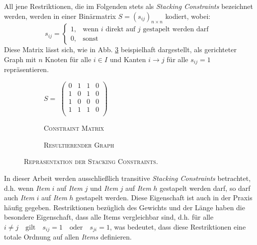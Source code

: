 All jene Restriktionen, die im Folgenden stets als \textit{Stacking Constraints} bezeichnet werden, werden in einer Binärmatrix $S = (s_{ij})_{n \times n}$ kodiert, wobei:
\[
    s_{ij} =
\begin{cases}
    1, & \text{wenn $i$ direkt auf $j$ gestapelt werden darf }\\
    0, & \text{sonst}
\end{cases}
\]
Diese Matrix lässt sich, wie in Abb. \ref{fig:matrix_to_graph} beispielhaft dargestellt,
als gerichteter Graph mit $n$ Knoten für alle $i \in I$ und Kanten $i \rightarrow j$ für alle $s_{ij} = 1$ repräsentieren.
\begin{figure}[H]
  \begin{subfigure}[b]{0.5\textwidth}
  \centering
    $S =$
    $\left(
    \begin{array}{rrrr}
    0 & 1 & 1 & 0 \\
    1 & 0 & 1 & 0 \\
    1 & 0 & 0 & 0 \\
    1 & 1 & 1 & 0 \\
    \end{array} \right) $
    \caption{\textsc{Constraint Matrix}}
    \label{fig:constraint_matrix}
  \end{subfigure}
  \hfill
  \begin{subfigure}[b]{0.5\textwidth}
  \centering
    \caption{\textsc{Resultierender Graph}}
    \label{fig:resulting_graph}
  \end{subfigure}
  \caption{\textsc{Repräsentation der Stacking Constraints.}}
  \label{fig:matrix_to_graph}
\end{figure}
In dieser Arbeit werden ausschließlich transitive \textit{Stacking Constraints} betrachtet, d.h.
wenn \textit{Item} $i$ auf \textit{Item} $j$ und \textit{Item} $j$ auf \textit{Item} $h$ gestapelt werden darf,
so darf auch \textit{Item} $i$ auf \textit{Item} $h$ gestapelt werden.\newline
Diese Eigenschaft ist auch in der Praxis häufig gegeben.
Restriktionen bezüglich des Gewichts und der Länge haben die besondere Eigenschaft, dass alle Items vergleichbar sind, d.h. für alle $i \neq j  \quad \text{gilt} \quad s_{ij} = 1 \quad \text{oder} \quad s_{ji} = 1$, was bedeutet, dass diese Restriktionen eine totale Ordnung auf allen \textit{Items} definieren.

